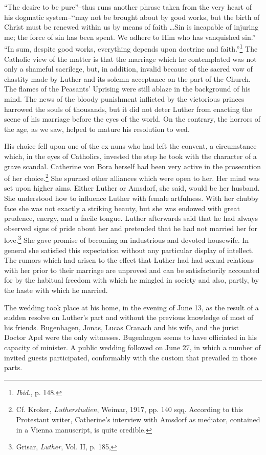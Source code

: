 “The desire to be pure”--thus runs another phrase taken from the
very heart of his dogmatic system--`‘may not be brought about by
good works, but the birth of Christ must be renewed within us by
means of faith \dots Sin is incapable of injuring me; the force of
sin has been spent. We adhere to Him who has vanquished sin.” “In
sum, despite good works, everything depends upon doctrine and
faith.”\footnote{\textit{Ibid.}, p. 148. }
The Catholic view of the matter is that the marriage which
he contemplated was not only a shameful sacrilege, but, in addition,
invalid because of the sacred vow of chastity made by Luther and
its solemn acceptance on the part of the Church.
The flames of the Peasants’ Uprising were still ablaze in the background
of his mind. The news of the bloody punishment inflicted by
the victorious princes harrowed the souls of thousands, but it did
not deter Luther from enacting the scene of his marriage before the
eyes of the world. On the contrary, the horrors of the age, as we saw,
helped to mature his resolution to wed.

His choice fell upon one of the ex-nuns who had left the convent,
a circumstance which, in the eyes of Catholics, invested the step he
took with the character of a grave scandal. Catherine von Bora herself
had been very active in the prosecution of her choice.\footnote
{Cf. Kroker, \textit{Lutherstudien}, Weimar, 1917, pp. 140 sqq. According to this Protestant
writer, Catherine’s interview with Amsdorf as mediator, contained in a Vienna manuscript,
is quite credible.}
She spurned
other alliances which were open to her. Her mind was set upon higher
aims. Either Luther or Amsdorf, she said, would be her husband. She
understood how to influence Luther with female artfulness. With
her chubby face she was not exactly a striking beauty, but she was
endowed with great prudence, energy, and a facile tongue. Luther
afterwards said that he had always observed signs of pride about her
and pretended that he had not married her for love.\footnote
{Grisar, \textit{Luther}, Vol. II, p. 185,}
She gave
promise of becoming an industrious and devoted housewife. In general
she satisfied this expectation without any particular display of
intellect. The rumors which had arisen to the effect that Luther had
had sexual relations with her prior to their marriage are unproved
and can be satisfactorily accounted for by the habitual freedom with
which he mingled in society and also, partly, by the haste with which
he married.

The wedding took place at his home, in the evening of June 13,
as the result of a sudden resolve on Luther’s part and without the
previous knowledge of most of his friends. Bugenhagen, Jonas, Lucas
Cranach and his wife, and the jurist Doctor Apel were the only witnesses.
Bugenhagen seems to have officiated in his capacity of minister. A public
wedding followed on June 27, in which a number of
invited guests participated, conformably with the custom that prevailed
in those parts.

